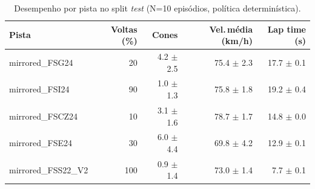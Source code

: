\begin{table}[H]
\centering
\caption{Desempenho por pista no split \textit{test} (N=10 episódios, política determinística).}
\label{tab:per_track_test}
\begin{tabular}{lrrrr}
\toprule
\textbf{Pista} & \textbf{Voltas (\%)} & \textbf{Cones} & \textbf{Vel.\,m\'edia (km/h)} & \textbf{Lap time (s)} \\
\midrule
mirrored_FSG24 & 20 & 4.2 $\pm$ 2.5 & 75.4 $\pm$ 2.3 & 17.7 $\pm$ 0.1 \\
mirrored_FSI24 & 90 & 1.0 $\pm$ 1.3 & 75.8 $\pm$ 1.8 & 19.2 $\pm$ 0.4 \\
mirrored_FSCZ24 & 10 & 3.1 $\pm$ 1.6 & 78.7 $\pm$ 1.7 & 14.8 $\pm$ 0.0 \\
mirrored_FSE24 & 30 & 6.0 $\pm$ 4.4 & 69.8 $\pm$ 4.2 & 12.9 $\pm$ 0.1 \\
mirrored_FSS22_V2 & 100 & 0.9 $\pm$ 1.4 & 73.0 $\pm$ 1.4 & 7.7 $\pm$ 0.1 \\
\bottomrule
\end{tabular}
\end{table}
